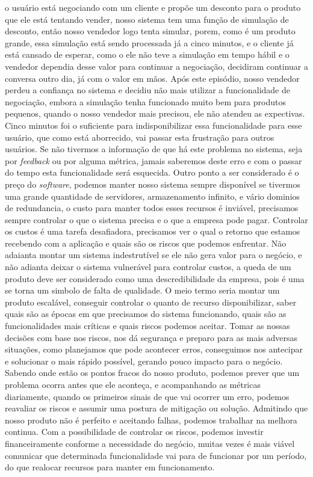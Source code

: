     o usuário está negociando com um cliente e propõe um desconto para o produto que
    ele está tentando vender, nosso sistema tem uma função de simulação de desconto,
    então nosso vendedor logo tenta simular, porem, como é um produto grande, essa
    simulação está sendo processada já a cinco minutos, e o cliente já está cansado
    de esperar, como o ele não teve a simulação em tempo hábil e o vendedor dependia
    desse valor para continuar a negociação, decidiram continuar a conversa outro dia,
    já com o valor em mãos. Após este episódio, nosso vendedor perdeu a confiança
    no sistema e decidiu não mais utilizar a funcionalidade de negociação, embora a
    simulação tenha funcionado muito bem para produtos pequenos, quando o nosso
    vendedor mais precisou, ele não atendeu as expectivas. Cinco minutos foi o
    suficiente para indisponibilizar essa funcionalidade para esse usuário, que
    como está aborrecido, vai passar esta frustração para outros usuários. Se não
    tivermos a informação de que há este problema no sistema, seja por \textit{feedback}
    ou por alguma métrica, jamais saberemos deste erro e com o passar do tempo
    esta funcionalidade será esquecida. \newline
    Outro ponto a ser considerado é o preço do \textit{software}, podemos manter
    nosso sistema sempre disponível se tivermos uma grande quantidade de servidores,
    armazenamento infinito, e vário dominios de redundancia, o custo para manter
    todos esses recursos é inviável, precisamos sempre controlar o que o sistema
    precisa e o que a empresa pode pagar. Controlar os custos é uma tarefa
    desafiadora, precisamos ver o qual o retorno que estamos recebendo com a aplicação
    e quais são os riscos que podemos enfrentar. Não adaianta montar um sistema
    indestrutível se ele não gera valor para o negócio, e não adianta deixar o
    sistema vulnerável para controlar custos, a queda de um produto deve ser
    considerado como uma descredibilidade da empresa, pois é uma se torna um
    simbolo de falta de qualidade. O meio termo seria montar um produto escalável,
    conseguir controlar o quanto de recurso disponibilizar, saber quais são as
    épocas em que precisamos do sistema funcionando, quais são as funcionalidades
    mais críticas e quais riscos podemos aceitar. Tomar as nossas decisões com
    base nos riscos, nos dá segurança e preparo para as mais adversas situações,
    como planejamos que pode acontecer erros, conseguimos nos antecipar e solucionar
    o mais rápido possível, gerando pouco impacto para o negócio. Sabendo onde estão
    os pontos fracos do nosso produto, podemos prever que um problema ocorra antes
    que ele aconteça, e acompanhando as métricas diariamente, quando os primeiros
    sinais de que vai ocorrer um erro, podemos reavaliar os riscos e assumir uma
    postura de mitigação ou solução. Admitindo que nosso produto não é perfeito e
    aceitando falhas, podemos trabalhar na melhora continua. Com a possibilidade
    de controlar os riscos, podemos investir financeiramente conforme a necessidade
    do negócio, muitas vezes é mais viável comunicar que determinada funcionalidade
    vai para de funcionar por um período, do que realocar recursos para manter em
    funcionamento.


